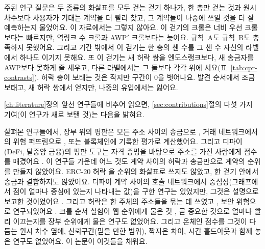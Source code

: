 주된 연구 질문은 두 종류의 화살표를 모두 걷는 걷기 하나가, 한 층만 걷는 것과 원시 차수보다 사용자가 기대는 계약을 더 빨리 찾고, 그 계약들이 나중에 쓰일 것을 더 잘 예측하는지 물었어요. 이 자료에서는 그렇지 않아요. 이 걷기의 크롤은 너비 우선 크롤보다는 빠르지만, 역링크 수 크롤과 AWP$'$ 크롤보다는 늦어요. 규칙~A도 규칙~B도 충족하지 못했어요. 그리고 기간 밖에서 이 걷기는 한 층의 센 수를 그 센 수 자신의 라벨에서 하나도 이기지 못해요. 또 이 걷기는 새 허락 쌍을 엔도스랭크보다, 새 송금자를 AWP보다 못하게 줄 세우고, 다른 라벨에서는 그 둘보다 각각 위에 서요(표~\ref{tab:cpr-contrasts}). 허락 층이 보태는 것은 작지만 구간이 0을 벗어나요. 발견 순서에서 조금 보태고, 새 허락 쌍에서 얻지만, 나중의 유입에서는 잃어요.


\ref{ch:literature}장의 앞선 연구들에 비추어 읽으면, \ref{sec:contributions}절의 다섯 가지 기여(이 연구가 새로 보탠 것)는 다음을 밝혀요.

살펴본 연구들에서, 장부 위의 평판은 모든 주소 사이의 송금으로 \parencite{do2023awp}, 거래 네트워크에서의 위험 퍼뜨림으로 \parencite{lin2025riskprop}, 또는 블록체인에 기록한 평가로 \parencite{bellini2020trust} 계산했어요. 그리고 디파이(DeFi, 탈중앙 금융)의 평판 도구는 자격 증명을 바탕으로 주소를 가진 사람에게 점수를 매겼어요 \parencite{humanpassportnddocs}. 이 연구들 가운데 어느 것도 계약 사이의 허락과 송금만으로 계약의 순위를 만들지 않았어요. ERC-20 허락 \parencite{vogelsteller2015erc20}을 순위의 화살표로 쓰지도 않았고, 한 걷기 안에서 송금과 결합하지도 않았어요. 디파이 계약 사이의 호출 네트워크에서 중심성(그래프에서 점이 얼마나 중심에 있는지 나타내는 값)을 구한 연구는 있었지만, 그것은 설명으로 보고한 것이었어요 \parencite{kitzler2023defi}. 그리고 허락은 한 주체의 주소들을 묶는 데 쓰였고 \parencite{victor2020clustering}, 보안 위험으로 연구되었어요 \parencite{wang2022unlimited}. 크롤 순서 실험이 웹 순위에게 물은 것 \parencite{cho1998crawling}, 곧 중요한 것으로 얼마나 빨리 이끄는지를 장부 순위에게 물은 연구도 없었어요. 그리고 온체인 점수를 그것이 다듬는 원시 차수 옆에, 신뢰구간(믿을 만한 범위), 짝지은 차이, 시간 홀드아웃과 함께 놓은 연구도 없었어요. 이 논문이 이것들을 채워요.

